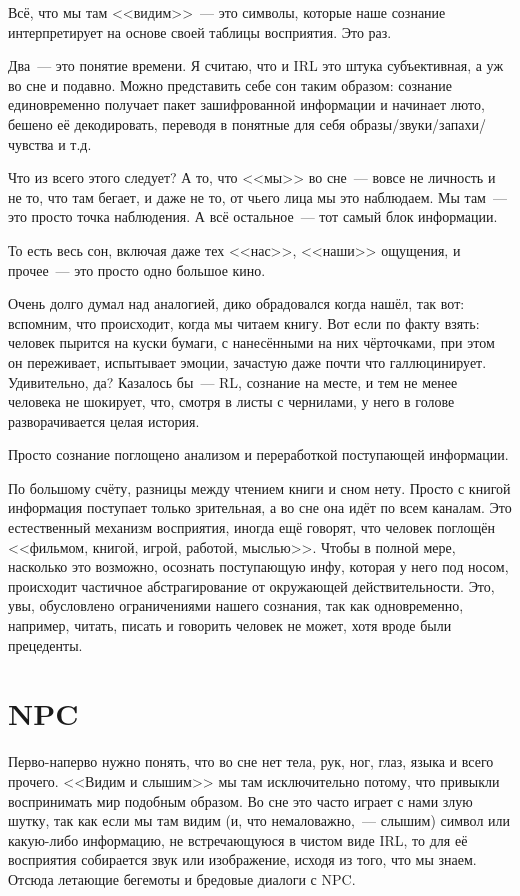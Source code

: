 \documentclass[a5paper,12pt,twoside]{memoir}
\begin{document}
Всё, что мы там <<видим>>~--- это символы, которые наше сознание интерпретирует на основе своей таблицы восприятия. Это раз. 

Два~--- это понятие времени. Я считаю, что и IRL это штука субъективная, а уж во сне и подавно. Можно представить себе сон таким образом: сознание единовременно получает пакет зашифрованной информации и начинает люто, бешено её декодировать, переводя в понятные для себя образы/звуки/за\-па\-хи/чув\-ства и т.д. 

Что из всего этого следует? А то, что <<мы>> во сне~--- вовсе не личность и не то, что там бегает, и даже не то, от чьего лица мы это наблюдаем. Мы там~--- это просто точка наблюдения. А всё остальное~--- тот самый блок информации. 

То есть весь сон, включая даже тех <<нас>>, <<наши>> ощущения, и прочее~--- это просто одно большое кино. %
  
Очень долго думал над аналогией, дико обрадовался когда нашёл, так вот: вспомним, что происходит, когда мы читаем книгу. Вот если по факту взять: человек пырится на куски бумаги, с нанесёнными на них чёрточками, при этом он переживает, испытывает эмоции, зачастую даже почти что галлюцинирует. Удивительно, да? Казалось бы~--- RL, сознание на месте, и тем не менее человека не шокирует, что, смотря в листы с чернилами, у него в голове разворачивается целая история.
 
Просто сознание поглощено анализом и переработкой поступающей информации.
 
По большому счёту, разницы между чтением книги и сном нету. Просто с книгой информация поступает только зрительная, а во сне она идёт по всем каналам. Это естественный механизм восприятия, иногда ещё говорят, что человек поглощён <<фильмом, книгой, игрой, работой, мыслью>>. Чтобы в полной мере, насколько это возможно, осознать поступающую инфу, которая у него под носом, происходит частичное абстрагирование от окружающей действительности. Это, увы, обусловлено ограничениями нашего сознания, так как одновременно, например, читать, писать и говорить человек не может, хотя вроде были прецеденты. 




\section{NPC}
Перво-наперво нужно понять, что во сне нет тела, рук, ног, глаз, языка и всего прочего. <<Видим и слышим>> мы там исключительно потому, что привыкли воспринимать мир подобным образом. Во сне это часто играет с нами злую шутку, так как если мы там видим (и, что немаловажно,~--- слышим) символ или какую-либо информацию, не встречающуюся в чистом виде IRL, то для её восприятия собирается звук или изображение, исходя из того, что мы знаем. Отсюда летающие бегемоты и бредовые диалоги с NPC. 
\end{document}
